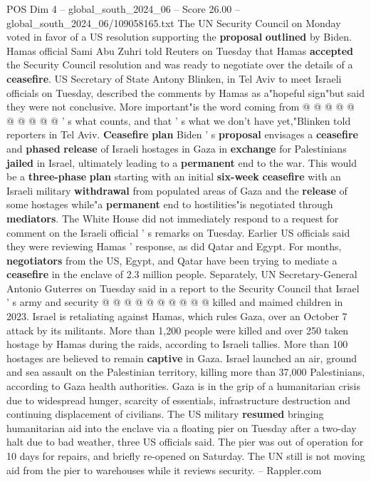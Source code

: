 \begin{textsample}{POS Dim 4 – global\_south\_2024\_06 – Score 26.00 – global\_south\_2024\_06/109058165.txt}
The UN Security Council on Monday voted in favor of a US resolution supporting the \textbf{proposal} \textbf{outlined} by Biden.
Hamas official Sami Abu Zuhri told Reuters on Tuesday that Hamas \textbf{accepted} the Security Council resolution and was ready to negotiate over the details of a \textbf{ceasefire}.
US Secretary of State Antony Blinken, in Tel Aviv to meet Israeli officials on Tuesday, described the comments by Hamas as a"hopeful sign"but said they were not conclusive.
More important"is the word coming from @ @ @ @ @ @ @ @ @ @ ' s what counts, and that ' s what we don't have yet,"Blinken told reporters in Tel Aviv. \textbf{Ceasefire} \textbf{plan} Biden ' s \textbf{proposal} envisages a \textbf{ceasefire} and \textbf{phased} \textbf{release} of Israeli hostages in Gaza in \textbf{exchange} for Palestinians \textbf{jailed} in Israel, ultimately leading to a \textbf{permanent} end to the war.
This would be a \textbf{three-phase} \textbf{plan} starting with an initial \textbf{six-week} \textbf{ceasefire} with an Israeli military \textbf{withdrawal} from populated areas of Gaza and the \textbf{release} of some hostages while"a \textbf{permanent} end to hostilities"is negotiated through \textbf{mediators}.
The White House did not immediately respond to a request for comment on the Israeli official ' s remarks on Tuesday.
Earlier US officials said they were reviewing Hamas ' response, as did Qatar and Egypt.
For months, \textbf{negotiators} from the US, Egypt, and Qatar have been trying to mediate a \textbf{ceasefire} in the enclave of 2.3 million people.
Separately, UN Secretary-General Antonio Guterres on Tuesday said in a report to the Security Council that Israel ' s army and security @ @ @ @ @ @ @ @ @ @ killed and maimed children in 2023.
Israel is retaliating against Hamas, which rules Gaza, over an October 7 attack by its militants.
More than 1,200 people were killed and over 250 taken hostage by Hamas during the raids, according to Israeli tallies.
More than 100 hostages are believed to remain \textbf{captive} in Gaza.
Israel launched an air, ground and sea assault on the Palestinian territory, killing more than 37,000 Palestinians, according to Gaza health authorities.
Gaza is in the grip of a humanitarian crisis due to widespread hunger, scarcity of essentials, infrastructure destruction and continuing displacement of civilians.
The US military \textbf{resumed} bringing humanitarian aid into the enclave via a floating pier on Tuesday after a two-day halt due to bad weather, three US officials said.
The pier was out of operation for 10 days for repairs, and briefly re-opened on Saturday.
The UN still is not moving aid from the pier to warehouses while it reviews security. -- Rappler.com

\end{textsample}
